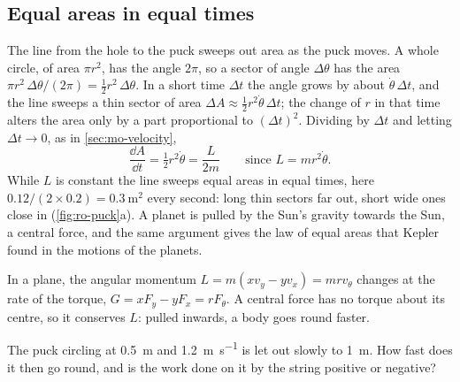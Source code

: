 \subsection*{Equal areas in equal times}

The line from the hole to the puck sweeps out area as the puck moves. A
whole circle, of area $\pi r^2$, has the angle $2\pi$, so a sector of
angle $\Delta\theta$ has the area $\pi r^2\,\Delta\theta/(2\pi) = \frac12
r^2\,\Delta\theta$. In a short time $\Delta t$ the angle grows by about
$\dot\theta\,\Delta t$, and the line sweeps a thin sector of area $\Delta A
\approx \frac12 r^2\dot\theta\,\Delta t$; the change of $r$ in that time
alters the area only by a part proportional to $(\Delta t)^2$. Dividing by
$\Delta t$ and letting $\Delta t \to 0$, as in \cref{sec:mo-velocity},
\begin{equation*}
   \frac{\dd A}{\dd t} = \tfrac12 r^2\dot\theta = \frac{L}{2m}
   \qquad\text{since $L = mr^2\dot\theta$.}
\end{equation*}
While $L$ is constant the line sweeps equal areas in equal times, here
$0.12/(2\times0.2) = \SI{0.3}{\metre\squared}$ every second: long thin
sectors far out, short wide ones close in (\cref{fig:ro-puck}a). A planet
is pulled by the Sun's gravity towards the Sun, a central force, and the
same argument gives the law of equal areas that Kepler found in the
motions of the planets.

\begin{keyidea}
In a plane, the angular momentum $L = m(xv_y - yv_x) = mr v_\theta$
changes at the rate of the torque, $G = xF_y - yF_x = rF_\theta$. A
central force has no torque about its centre, so it conserves $L$: pulled
inwards, a body goes round faster.
\end{keyidea}


\begin{selfcheck}
The puck circling at \SI{0.5}{\metre} and \SI{1.2}{\metre\per\second} is
let out slowly to \SI{1}{\metre}. How fast does it then go round, and is
the work done on it by the string positive or negative?
\end{selfcheck}
